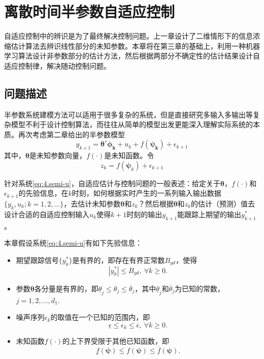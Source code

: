 \chapter{离散时间半参数自适应控制}\label{chap:4}
自适应控制中的辨识是为了最终解决控制问题。上一章设计了二维情形下的信息浓缩估计算法去辨识线性部分的未知参数。本章将在第三章的基础上，利用一种机器学习算法设计非参数部分的估计方法，然后根据两部分不确定性的估计结果设计自适应控制律，解决随动控制问题。

\section{问题描述}\label{sect:4.1}
半参数系统建模方法可以适用于很多复杂的系统，但是直接研究多输入多输出等复杂模型不利于设计控制算法，而往往从简单的模型出发更能深入理解实际系统的本质。再次考虑第二章给出的半参数模型
\begin{equation}%
\label{eq:4.semi-u}
y_{k+1} = \bm{\theta}^{\tau}\bm{\phi_{k}}+u_{k}+f(\bm{\bm{\psi}_{k}})+\epsilon_{k+1}
\end{equation}
其中，$\bm{\theta}$是未知参数向量，$f(\cdot)$是未知函数。令
\begin{equation}
z_{k} = f(\bm{\psi}_{k}) + \epsilon_{k+1}
\end{equation}

针对系统\eqref{eq:4.semi-u}，自适应估计与控制问题的一般表述：给定关于$\bm{\theta}$，$f(\cdot)$和$\epsilon_{k+1}$的先验信息，在$k$时刻，如何根据实时产生的一系列输入输出数据$\{y_{k},u_{k};k=1,2,\ldots\}$，去估计未知参数$\bm{\theta}$和$z_{k}$？然后根据$\bm{\theta}$和$z_{k}$的估计（预测）值去设计合适的自适应控制输入$u_{k}$使得$k+1$时刻的输出$y_{k+1}$能跟踪上期望的输出$y_{k+1}^{*}$。

本章假设系统\eqref{eq:4.semi-u}有如下先验信息：
\begin{itemize}
\item 期望跟踪信号$\{y_{k}^{*}\}$是有界的，即存在有界正常数$B_{yd}$，使得
\begin{equation}\label{eq:4.ydB}
|y_{k}^{*}|\leq B_{yd},\ \forall k\geq0.
\end{equation}
\item 参数$\bm{\theta}$各分量是有界的，即$\underline{\theta}_{j}\leq\theta_{j}\leq\overline{\theta}_{j}$，其中$\underline{\theta}_{j}$和$\overline{\theta}_{j}$为已知的常数，$j=1,2,\ldots,d_{1}$.
\item 噪声序列$\epsilon_{k}$的取值在一个已知的范围内，即
\begin{equation}\label{eq:4.wB}
\underline{\epsilon}\leq\epsilon_{k}\leq\overline{\epsilon},\ \forall k\geq0.
\end{equation}
\item 未知函数$f(\cdot)$的上下界受限于其他已知函数，即
\begin{equation}\label{eq:4.fB}
\underline{f}(\bm{\psi})\leq f(\bm{\psi})\leq \overline{f}(\bm{\psi}).
\end{equation}
\end{itemize}

